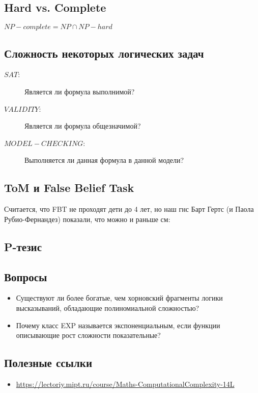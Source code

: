 \subsection{Hard vs. Complete}
$NP-complete =  NP \cap NP-hard$

\subsection{Сложность некоторых логических задач}

\begin{description}
\item[$SAT$:] Является ли формула выполнимой?
\item[$VALIDITY$:] Является ли формула общезначимой?
\item[$MODEL-CHECKING$:] Выполняется ли данная формула в данной модели?	
\end{description}


\subsection{ToM и False Belief Task}
Считается, что FBT не проходят дети  до 4 лет, но наш гнс Барт Гертс (и Паола Рубио-Фернандез) показали, что можно и раньше см: \autocite{Rubio-Fernandez2013a}
\subsection{P-тезис}

\subsection{Вопросы}
\begin{itemize}
    \item Существуют ли более богатые, чем хорновский фрагменты логики высказываний, обладающие полиномиальной сложностью?
    \item Почему класс EXP называется экспоненциальным, если функции описывающие рост сложности показательные?
\end{itemize}

\subsection{Полезные ссылки}
\begin{itemize}
    \item \url{https://lectoriy.mipt.ru/course/Maths-ComputationalComplexity-14L}
\end{itemize}